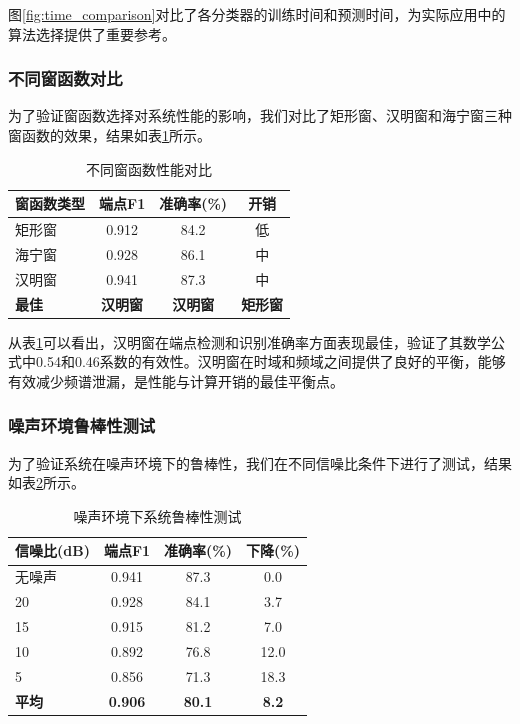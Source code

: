 \documentclass[sigconf,nonacm]{acmart}
\begin{document}
图\ref{fig:time_comparison}对比了各分类器的训练时间和预测时间，为实际应用中的算法选择提供了重要参考。

\subsubsection{不同窗函数对比}

为了验证窗函数选择对系统性能的影响，我们对比了矩形窗、汉明窗和海宁窗三种窗函数的效果，结果如表\ref{tab:window_comparison}所示。

\begin{table}[htbp]
\caption{不同窗函数性能对比}
\label{tab:window_comparison}
\begin{center}
\begin{tabular}{lccc}
\toprule
\textbf{窗函数类型} & \textbf{端点F1} & \textbf{准确率(\%)} & \textbf{开销} \\
\midrule
矩形窗 & 0.912 & 84.2 & 低 \\
海宁窗 & 0.928 & 86.1 & 中 \\
汉明窗 & 0.941 & 87.3 & 中 \\
\midrule
\textbf{最佳} & \textbf{汉明窗} & \textbf{汉明窗} & \textbf{矩形窗} \\
\bottomrule
\end{tabular}
\end{center}
\end{table}

从表\ref{tab:window_comparison}可以看出，汉明窗在端点检测和识别准确率方面表现最佳，验证了其数学公式中0.54和0.46系数的有效性。汉明窗在时域和频域之间提供了良好的平衡，能够有效减少频谱泄漏，是性能与计算开销的最佳平衡点。

\subsubsection{噪声环境鲁棒性测试}

为了验证系统在噪声环境下的鲁棒性，我们在不同信噪比条件下进行了测试，结果如表\ref{tab:noise_robustness}所示。

\begin{table}[htbp]
\caption{噪声环境下系统鲁棒性测试}
\label{tab:noise_robustness}
\begin{center}
\begin{tabular}{lccc}
\toprule
\textbf{信噪比(dB)} & \textbf{端点F1} & \textbf{准确率(\%)} & \textbf{下降(\%)} \\
\midrule
无噪声 & 0.941 & 87.3 & 0.0 \\
20 & 0.928 & 84.1 & 3.7 \\
15 & 0.915 & 81.2 & 7.0 \\
10 & 0.892 & 76.8 & 12.0 \\
5 & 0.856 & 71.3 & 18.3 \\
\midrule
\textbf{平均} & \textbf{0.906} & \textbf{80.1} & \textbf{8.2} \\
\bottomrule
\end{tabular}
\end{center}
\end{table}
\end{document}
